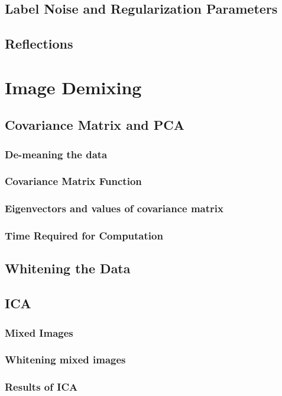 \documentclass[11pt, oneside]{article}
\begin{document}
\subsection{Label Noise and Regularization Parameters}

\subsection{Reflections}

\section{Image Demixing}

\subsection{Covariance Matrix and PCA}

\subsubsection{De-meaning the data}

\subsubsection{Covariance Matrix Function}

\subsubsection{Eigenvectors and values of covariance matrix}

\subsubsection{Time Required for Computation}

\subsection{Whitening the Data}

\subsection{ICA}

\subsubsection{Mixed Images}

\subsubsection{Whitening mixed images}

\subsubsection{Results of ICA}
\end{document}
